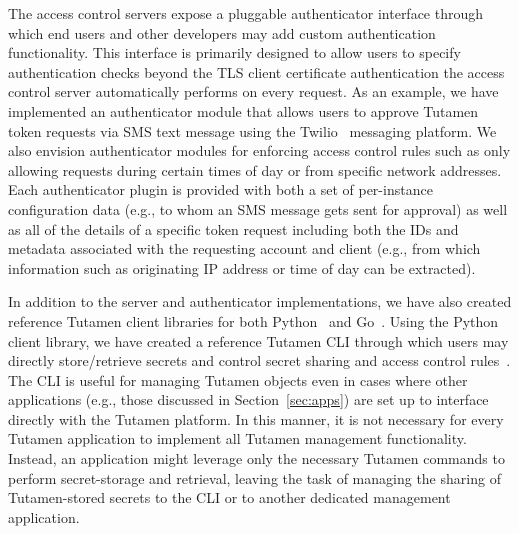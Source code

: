 The access control servers expose a pluggable authenticator interface
through which end users and other developers may add custom
authentication functionality. This interface is primarily designed to
allow users to specify authentication checks beyond the TLS client
certificate authentication the access control server automatically
performs on every request. As an example, we have implemented an
authenticator module that allows users to approve Tutamen token
requests via SMS text message using the Twilio~\cite{twilio} messaging
platform. We also envision authenticator modules for enforcing access
control rules such as only allowing requests during certain times of
day or from specific network addresses. Each authenticator plugin is
provided with both a set of per-instance configuration data (e.g., to
whom an SMS message gets sent for approval) as well as all of the
details of a specific token request including both the IDs and
metadata associated with the requesting account and client (e.g., from
which information such as originating IP address or time of day can be
extracted).

In addition to the server and authenticator implementations, we have
also created reference Tutamen client libraries for both
Python~\cite{src-tutamen-pytutamen} and
Go~\cite{src-tutamen-go}. Using the Python client library, we have
created a reference Tutamen CLI through which users may directly
store/retrieve secrets and control secret sharing and access control
rules~\cite{src-tutamen-cli}. The CLI is useful for managing Tutamen
objects even in cases where other applications (e.g., those discussed
in Section~\ref{sec:apps}) are set up to interface directly with the
Tutamen platform. In this manner, it is not necessary for every
Tutamen application to implement all Tutamen management
functionality. Instead, an application might leverage only the
necessary Tutamen commands to perform secret-storage and retrieval,
leaving the task of managing the sharing of Tutamen-stored secrets to
the CLI or to another dedicated management application.


